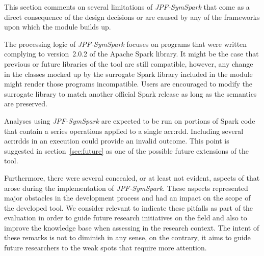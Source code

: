 \label{sec:limitations}

%
%
%
%
%

This section comments on several limitations of \textit{JPF-SymSpark} that come as a direct consequence of the design decisions or are caused by any of the frameworks upon which the module builds up.

The processing logic of \textit{JPF-SymSpark} focuses on programs that were written complying to version~2.0.2 of the Apache Spark library. It might be the case that previous or future libraries of the tool are still compatible, however, any change in the classes mocked up by the surrogate Spark library included in the module might render those programs incompatible. Users are encouraged to modify the surrogate library to match another official Spark release as long as the semantics are preserved.

Analyses using \textit{JPF-SymSpark} are expected to be run on portions of Spark code that contain a series operations applied to a single \acrshort{acr:rdd}. Including several \acrshort{acr:rdd}s in an execution could provide an invalid outcome. This point is suggested in section~\ref{sec:future} as one of the possible future extensions of the tool.

Furthermore, there were several concealed, or at least not evident, aspects of \spf{} that arose during the implementation of \textit{JPF-SymSpark}. These aspects represented major obstacles in the development process and had an impact on the scope of the developed tool. We consider relevant to indicate these pitfalls as part of the evaluation in order to guide future research initiatives on the field and also to improve the knowledge base when assessing \spf{} in the research context. The intent of these remarks is not to diminish \spf{} in any sense, on the contrary, it aims to guide future researchers to the weak spots that require more attention.

